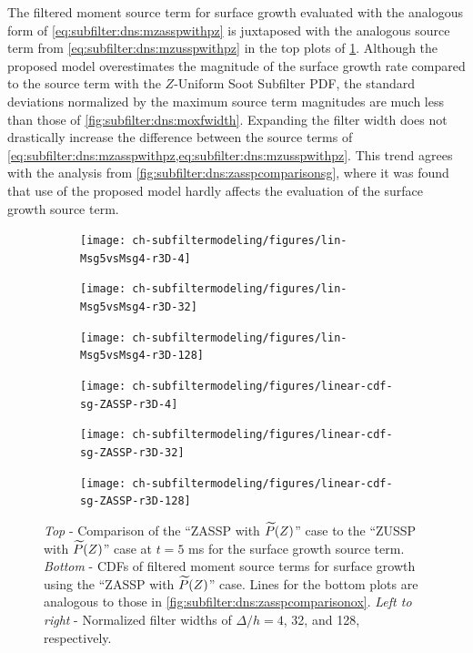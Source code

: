 The filtered moment source term for surface growth evaluated with the analogous form of \cref{eq:subfilter:dns:mzasspwithpz} is juxtaposed with the analogous source term from \cref{eq:subfilter:dns:mzusspwithpz} in the top plots of \cref{fig:subfilter:dns:msgfwidth}. Although the proposed model overestimates the magnitude of the surface growth rate compared to the source term with the $Z$-Uniform Soot Subfilter PDF, the standard deviations normalized by the maximum source term magnitudes are much less than those of \cref{fig:subfilter:dns:moxfwidth}. Expanding the filter width does not drastically increase the difference between the source terms of \cref{eq:subfilter:dns:mzasspwithpz,eq:subfilter:dns:mzusspwithpz}. This trend agrees with the analysis from \cref{fig:subfilter:dns:zasspcomparisonsg}, where it was found that use of the proposed model hardly affects the evaluation of the surface growth source term. %

\begin{figure}[ht]
  \centering
  \begin{subfigure}[b]{0.33\linewidth}
    \centering
    \texttt{[image: ch-subfiltermodeling/figures/lin-Msg5vsMsg4-r3D-4]}
  \end{subfigure}%
  \begin{subfigure}[b]{0.33\linewidth}
    \centering
    \texttt{[image: ch-subfiltermodeling/figures/lin-Msg5vsMsg4-r3D-32]}
  \end{subfigure}%
  \begin{subfigure}[b]{0.33\linewidth}
    \centering
    \texttt{[image: ch-subfiltermodeling/figures/lin-Msg5vsMsg4-r3D-128]}
  \end{subfigure}
  \begin{subfigure}[b]{0.33\linewidth}
    \centering
    \texttt{[image: ch-subfiltermodeling/figures/linear-cdf-sg-ZASSP-r3D-4]}
  \end{subfigure}%
  \begin{subfigure}[b]{0.33\linewidth}
    \centering
    \texttt{[image: ch-subfiltermodeling/figures/linear-cdf-sg-ZASSP-r3D-32]}
  \end{subfigure}%
  \begin{subfigure}[b]{0.33\linewidth}
    \centering
    \texttt{[image: ch-subfiltermodeling/figures/linear-cdf-sg-ZASSP-r3D-128]}
  \end{subfigure}
  \caption[$\mean{\dot{M}}_{1,0}^{sg}$ Using ZASSP with $\pz$ for Various $\Delta/h$]{\textit{Top} - Comparison of the ``ZASSP with $\pz$'' case to the ``ZUSSP with $\pz$'' case at $t = 5$ ms for the surface growth source term. \textit{Bottom} - CDFs of filtered moment source terms for surface growth using the ``ZASSP with $\pz$'' case. Lines for the bottom plots are analogous to those in \cref{fig:subfilter:dns:zasspcomparisonox}. \textit{Left to right} - Normalized filter widths of $\Delta/h = 4$, 32, and 128, respectively.}
  \label{fig:subfilter:dns:msgfwidth}
\end{figure}
